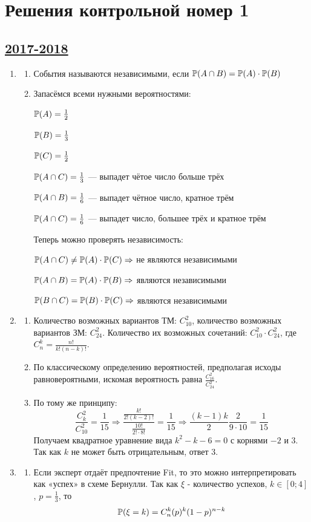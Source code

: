 \thispagestyle{empty}
\section{Решения контрольной номер 1}

\subsection[2017-2018]{\hyperref[sec:kr_01_2017_2018]{2017-2018}}
\label{sec:sol_kr_01_2017_2018}

\begin{enumerate}
\item
\begin{enumerate}
\item События называются независимыми, если  $ \P(A \cap B) = \P(A) \cdot \P(B)$
\item Запасёмся всеми нужными вероятностями:

$\P(A) = \frac{1}{2}$

$\P(B) = \frac{1}{3}$

$\P(C) = \frac{1}{2}$

$\P(A \cap C) = \frac{1}{3} $ — выпадет чётое число больше трёх

$\P(A \cap B)  = \frac{1}{6}$ — выпадет чётное число, кратное трём

$\P(A \cap C) = \frac{1}{6}$ — выпадет число, большее трёх и кратное трём

Теперь можно проверять независимость:

$\P(A \cap C) \neq \P(A) \cdot \P(C) \Rightarrow$  не являются независимыми

$ \P(A \cap B) = \P(A) \cdot \P(B) \Rightarrow$ являются независимыми

$ \P(B \cap C) = \P(B) \cdot \P(C) \Rightarrow$ являются независимыми

\end{enumerate}
\item
\begin{enumerate}
\item Количество возможных вариантов ТМ: $ C_{10}^2 $,  количество возможных
вариантов ЗМ: $ C_{24}^2 $. Количество их возможных сочетаний: $ C_{10}^2 \cdot C_{24}^2$,
где $ C_n^k = \frac{n!}{k!(n-k)!}$.
\item По классическому определению вероятностей, предполагая исходы равновероятными,
искомая вероятность равна $\frac{C_{16}^2}{C_{24}^2}$.
\item По тому же принципу:
\[
\frac{C_k^2}{C_{10}^2} = \frac{1}{15} \Rightarrow \frac{\frac{k!}{2!(k-2)!}}{\frac{10!}{2! \cdot 8!}} = \frac{1}{15} \Rightarrow \frac{(k-1)k}{2}\frac{ 2}{9 \cdot 10} = \frac{1}{15}
\]
Получаем квадратное уравнение вида $ k^2 - k - 6 = 0 $ с корнями $-2$ и $3$.
Так как $k$ не может быть отрицательным, ответ $3$.
\end{enumerate}
\item
\begin{enumerate}
\item Если эксперт отдаёт предпочтение Fit, то это можно интерпретировать как
«успех» в схеме Бернулли. Так как $\xi$ - количество успехов,
$ k \in [0;4]$, $p = \frac{1}{3} $, то
\[
\P(\xi = k) = C_n^k(p)^k(1-p)^{n-k}
\]


\end{enumerate}
\end{enumerate}

